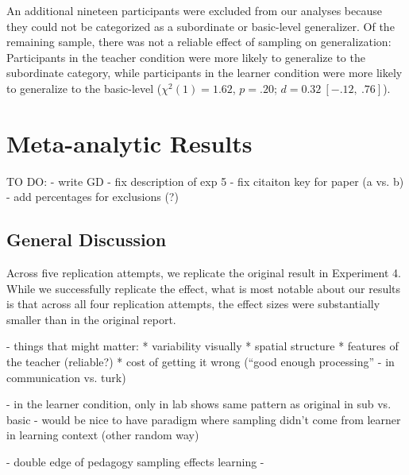 \documentclass[man]{apa2}
\begin{document}
An additional nineteen participants were excluded from our analyses because they could not be categorized as a subordinate or basic-level generalizer. Of the remaining sample, there was not a reliable effect of sampling on generalization: Participants in the teacher condition were more likely to generalize to the subordinate category, while participants in the learner condition were more likely to generalize to the basic-level ($\chi^2(1) = 1.62$, $p = .20$; $d = 0.32\ [-.12,\ .76]$).

\section{Meta-analytic Results}

\cite{Viechtbauer2010}


TO DO:
- write GD
- fix description of exp 5
- fix citaiton key for paper (a vs. b)
- add percentages for exclusions (?)


\subsection{General Discussion}

Across five replication attempts, we replicate the original result in Experiment 4. While we successfully replicate the effect, what is most notable about our results is that across all four replication attempts, the effect sizes were substantially smaller than in the original report. 

- things that might matter:
* variability visually
* spatial structure
* features of the teacher (reliable?)
* cost of getting it wrong (``good enough processing'' - in communication vs. turk) 

- in the learner condition, only in lab shows same pattern as original in sub vs. basic
- would be nice to have paradigm where sampling didn't come from learner in learning context (other random way)

- double edge of pedagogy \cite{bonowitz2011double} sampling effects learning
- 
\end{document}
